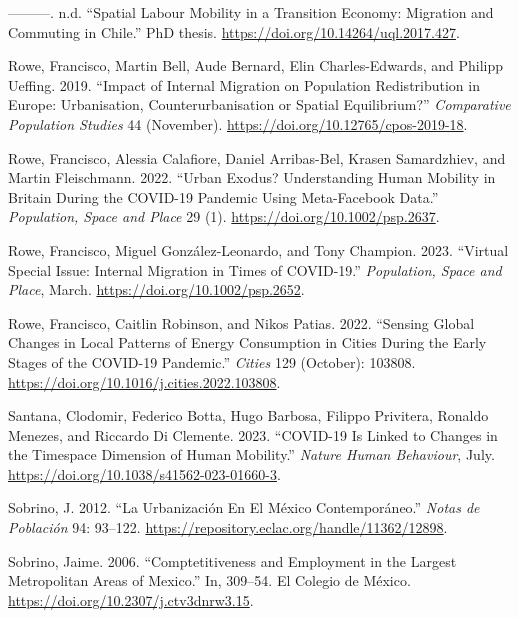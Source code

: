 \documentclass[
  11pt,
]{article}
\newlength{\cslhangindent}
\newlength{\cslentryspacingunit} %
\newenvironment{CSLReferences}[2] %
 {%
  \setlength{\parindent}{0pt}
  \ifodd #1
  \let\oldpar\par
  \def\par{\hangindent=\cslhangindent\oldpar}
  \fi
  \setlength{\parskip}{#2\cslentryspacingunit}
 }%
 {}
\begin{document}
\begin{CSLReferences}{1}{0}
\leavevmode{}%
---------. n.d. {``Spatial Labour Mobility in a Transition Economy:
Migration and Commuting in Chile.''} PhD thesis.
\url{https://doi.org/10.14264/uql.2017.427}.

\leavevmode{}%
Rowe, Francisco, Martin Bell, Aude Bernard, Elin Charles-Edwards, and
Philipp Ueffing. 2019. {``Impact of Internal Migration on Population
Redistribution in Europe: Urbanisation, Counterurbanisation or Spatial
Equilibrium?''} \emph{Comparative Population Studies} 44 (November).
\url{https://doi.org/10.12765/cpos-2019-18}.

\leavevmode{}%
Rowe, Francisco, Alessia Calafiore, Daniel Arribas-Bel, Krasen
Samardzhiev, and Martin Fleischmann. 2022. {``Urban Exodus?
Understanding Human Mobility in Britain During the COVID{-}19 Pandemic
Using Meta{-}Facebook Data.''} \emph{Population, Space and Place} 29
(1). \url{https://doi.org/10.1002/psp.2637}.

\leavevmode{}%
Rowe, Francisco, Miguel González-Leonardo, and Tony Champion. 2023.
{``Virtual Special Issue: Internal Migration in Times of COVID{-}19.''}
\emph{Population, Space and Place}, March.
\url{https://doi.org/10.1002/psp.2652}.

\leavevmode{}%
Rowe, Francisco, Caitlin Robinson, and Nikos Patias. 2022. {``Sensing
Global Changes in Local Patterns of Energy Consumption in Cities During
the Early Stages of the COVID-19 Pandemic.''} \emph{Cities} 129
(October): 103808. \url{https://doi.org/10.1016/j.cities.2022.103808}.

\leavevmode{}%
Santana, Clodomir, Federico Botta, Hugo Barbosa, Filippo Privitera,
Ronaldo Menezes, and Riccardo Di Clemente. 2023. {``COVID-19 Is Linked
to Changes in the Time{\textendash}space Dimension of Human Mobility.''}
\emph{Nature Human Behaviour}, July.
\url{https://doi.org/10.1038/s41562-023-01660-3}.

\leavevmode{}%
Sobrino, J. 2012. {``La Urbanización En El México Contemporáneo.''}
\emph{Notas de Población} 94: 93--122.
\url{https://repository.eclac.org/handle/11362/12898}.

\leavevmode{}%
Sobrino, Jaime. 2006. {``Comptetitiveness and Employment in the Largest
Metropolitan Areas of Mexico.''} In, 309--54. El Colegio de México.
\url{https://doi.org/10.2307/j.ctv3dnrw3.15}.


\end{CSLReferences}
\end{document}
